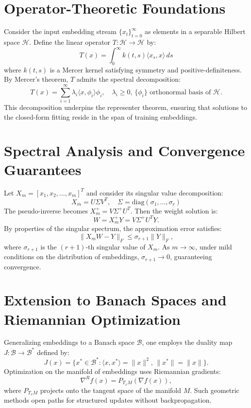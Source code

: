 \documentclass[11pt]{article}
\begin{document}
\newpage
\section{Operator-Theoretic Foundations}
Consider the input embedding stream $\{x_t\}_{t=0}^\infty$ as elements in a separable Hilbert space $\mathcal{H}$. Define the linear operator $T: \mathcal{H} \to \mathcal{H}$ by:
\begin{equation}
T(x) = \int_0^\infty k(t, s) \langle x_s, x \rangle \, ds
\end{equation}
where $k(t,s)$ is a Mercer kernel satisfying symmetry and positive-definiteness. By Mercer's theorem, $T$ admits the spectral decomposition:
\begin{equation}
T(x) = \sum_{i=1}^\infty \lambda_i \langle x, \phi_i \rangle \phi_i, \quad \lambda_i \ge 0, \, \{\phi_i\} \text{ orthonormal basis of }\mathcal{H}.
\end{equation}
This decomposition underpins the representer theorem, ensuring that solutions to the closed-form fitting reside in the span of training embeddings.

\section{Spectral Analysis and Convergence Guarantees}
Let $X_m = [x_1, x_2, \dots, x_m]^T$ and consider its singular value decomposition:
\begin{equation}
X_m = U \Sigma V^T, \quad \Sigma = \mathrm{diag}(\sigma_1, \dots, \sigma_r)
\end{equation}
The pseudo-inverse becomes $X_m^+ = V \Sigma^+ U^T$. Then the weight solution is:
\begin{equation}
W = X_m^+ Y = V \Sigma^+ U^T Y.
\end{equation}
By properties of the singular spectrum, the approximation error satisfies:
\begin{equation}
\|X_m W - Y\|_F \le \sigma_{r+1} \|Y\|_F,
\end{equation}
where $\sigma_{r+1}$ is the $(r+1)$-th singular value of $X_m$. As $m \to \infty$, under mild conditions on the distribution of embeddings, $\sigma_{r+1} \to 0$, guaranteeing convergence.

\section{Extension to Banach Spaces and Riemannian Optimization}
Generalizing embeddings to a Banach space $\mathcal{B}$, one employs the duality map $J: \mathcal{B} \to \mathcal{B}^*$ defined by:
\begin{equation}
J(x) = \{ x^* \in \mathcal{B}^* : \langle x, x^* \rangle = \|x\|^2, \, \|x^*\| = \|x\| \}.
\end{equation}
Optimization on the manifold of embeddings uses Riemannian gradients:
\begin{equation}
\nabla^R f(x) = P_{T_x M}(\nabla f(x)),
\end{equation}
where $P_{T_x M}$ projects onto the tangent space of the manifold $M$. Such geometric methods open paths for structured updates without backpropagation.
\end{document}
